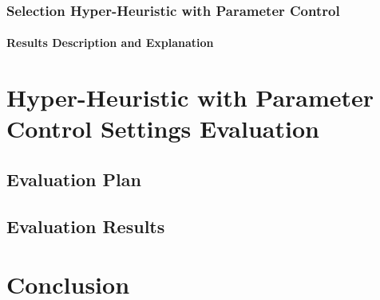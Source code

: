 \subsubsection{Selection Hyper-Heuristic with Parameter Control}

\paragraph{Results Description and Explanation}





\section{Hyper-Heuristic with Parameter Control Settings Evaluation}\label{eval: hh-pc}
\subsection{Evaluation Plan}\label{eval: hh-pc plan}
\subsection{Evaluation Results}\label{eval: hh-pc results}



\section{Conclusion}\label{eval: conclution}
